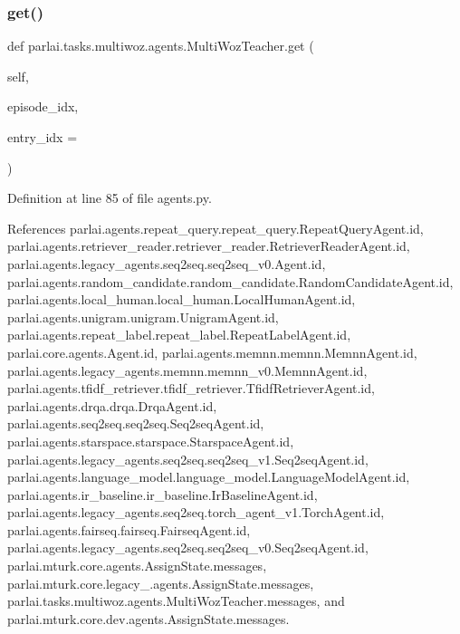 \subsubsection{\texorpdfstring{get()}{get()}}
{\footnotesize\ttfamily def parlai.\+tasks.\+multiwoz.\+agents.\+Multi\+Woz\+Teacher.\+get (\begin{DoxyParamCaption}\item[{}]{self,  }\item[{}]{episode\+\_\+idx,  }\item[{}]{entry\+\_\+idx = {} }\end{DoxyParamCaption})}



Definition at line 85 of file agents.\+py.



References parlai.\+agents.\+repeat\+\_\+query.\+repeat\+\_\+query.\+Repeat\+Query\+Agent.\+id, parlai.\+agents.\+retriever\+\_\+reader.\+retriever\+\_\+reader.\+Retriever\+Reader\+Agent.\+id, parlai.\+agents.\+legacy\+\_\+agents.\+seq2seq.\+seq2seq\+\_\+v0.\+Agent.\+id, parlai.\+agents.\+random\+\_\+candidate.\+random\+\_\+candidate.\+Random\+Candidate\+Agent.\+id, parlai.\+agents.\+local\+\_\+human.\+local\+\_\+human.\+Local\+Human\+Agent.\+id, parlai.\+agents.\+unigram.\+unigram.\+Unigram\+Agent.\+id, parlai.\+agents.\+repeat\+\_\+label.\+repeat\+\_\+label.\+Repeat\+Label\+Agent.\+id, parlai.\+core.\+agents.\+Agent.\+id, parlai.\+agents.\+memnn.\+memnn.\+Memnn\+Agent.\+id, parlai.\+agents.\+legacy\+\_\+agents.\+memnn.\+memnn\+\_\+v0.\+Memnn\+Agent.\+id, parlai.\+agents.\+tfidf\+\_\+retriever.\+tfidf\+\_\+retriever.\+Tfidf\+Retriever\+Agent.\+id, parlai.\+agents.\+drqa.\+drqa.\+Drqa\+Agent.\+id, parlai.\+agents.\+seq2seq.\+seq2seq.\+Seq2seq\+Agent.\+id, parlai.\+agents.\+starspace.\+starspace.\+Starspace\+Agent.\+id, parlai.\+agents.\+legacy\+\_\+agents.\+seq2seq.\+seq2seq\+\_\+v1.\+Seq2seq\+Agent.\+id, parlai.\+agents.\+language\+\_\+model.\+language\+\_\+model.\+Language\+Model\+Agent.\+id, parlai.\+agents.\+ir\+\_\+baseline.\+ir\+\_\+baseline.\+Ir\+Baseline\+Agent.\+id, parlai.\+agents.\+legacy\+\_\+agents.\+seq2seq.\+torch\+\_\+agent\+\_\+v1.\+Torch\+Agent.\+id, parlai.\+agents.\+fairseq.\+fairseq.\+Fairseq\+Agent.\+id, parlai.\+agents.\+legacy\+\_\+agents.\+seq2seq.\+seq2seq\+\_\+v0.\+Seq2seq\+Agent.\+id, parlai.\+mturk.\+core.\+agents.\+Assign\+State.\+messages, parlai.\+mturk.\+core.\+legacy\+\_.\+agents.\+Assign\+State.\+messages, parlai.\+tasks.\+multiwoz.\+agents.\+Multi\+Woz\+Teacher.\+messages, and parlai.\+mturk.\+core.\+dev.\+agents.\+Assign\+State.\+messages.



